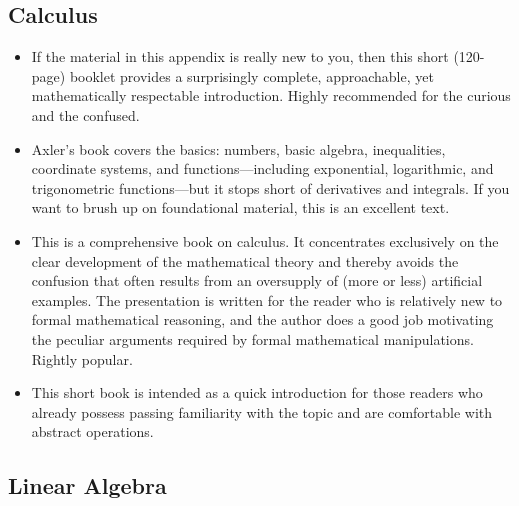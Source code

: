 \subsection{Calculus}

\begin{itemize}
\item {}
  If the material in this appendix is really new to you, then
  this short (120-page) booklet provides a surprisingly complete,
  approachable, yet mathematically respectable introduction. Highly
  recommended for the curious and the confused.

\item {}
  Axler's book covers the basics: numbers, basic algebra,
  inequalities, coordinate systems, and functions---including
  exponential, logarithmic, and trigonometric functions---but it stops
  short of derivatives and integrals. If you want to brush up on
  foundational material, this is an excellent text.

\item {}
  This is a comprehensive book on calculus. It concentrates
  exclusively on the clear development of the mathematical theory and
  thereby avoids the confusion that often results from an oversupply
  of (more or less) artificial examples. The presentation is written
  for the reader who is relatively new to formal mathematical
  reasoning, and the author does a good job motivating the peculiar
  arguments required by formal mathematical manipulations. Rightly
  popular.

\item {}
  This short book is intended as a quick introduction for those
  readers who already possess passing familiarity with the topic and
  are comfortable with abstract operations.
\end{itemize}

\vspace*{-6pt}
\subsection{Linear Algebra}

